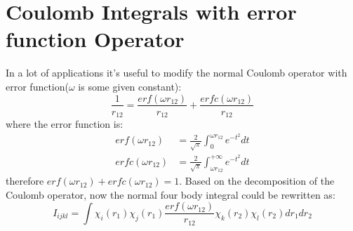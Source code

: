
\section{Coulomb Integrals with error function Operator}

In a lot of applications it's useful to modify the normal Coulomb operator with 
error function($\omega$ is some given constant):
\begin{equation}\label{erf_coulomb_integral:1}
 \frac{1}{r_{12}} = \frac{erf(\omega r_{12})}{r_{12}} + \frac{erfc(\omega r_{12})}{r_{12}}
\end{equation}
where the error function is:
\begin{align}\label{erf_coulomb_integral:2}
 erf(\omega r_{12})  &= \frac{2}{\sqrt{\pi}}\int_{0}^{\omega r_{12}} e^{-  t^{2}} dt \nonumber \\ 
 erfc(\omega r_{12}) &= \frac{2}{\sqrt{\pi}}\int_{\omega r_{12}}^{+\infty} e^{- t^{2}} dt
\end{align}
therefore $erf(\omega r_{12}) + erfc(\omega r_{12}) = 1$. Based on the decomposition of the Coulomb operator, 
now the normal four body integral could be rewritten as:
\begin{equation}\label{erf_coulomb_integral:3}
 I_{ijkl} = \int \chi_{i}(r_{1})\chi_{j}(r_{1})\frac{erf(\omega r_{12})}{r_{12}}
\chi_{k}(r_{2})\chi_{l}(r_{2}) dr_{1} dr_{2}
\end{equation}

